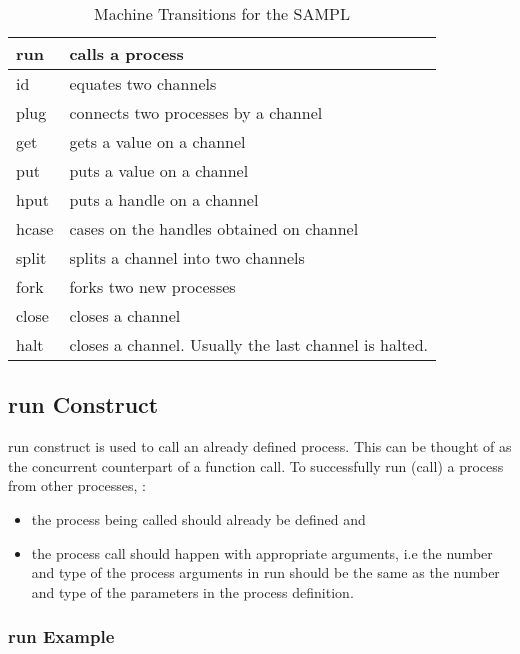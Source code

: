 \documentclass[11pt]{article}
\newcommand{\<}{\langle}
\renewcommand{\>}{\rangle}
\begin{document}
\begin{table}[!h]
\begin{center}
    \begin{tabular}{|l||l|}
    \hline 
        {\sf run} & calls a process \\ \hline 
        {\sf id}  & equates two channels \\ \hline 
        {\sf plug} & connects two processes by a channel \\ \hline  
        {\sf get} & gets a value on a channel \\ \hline 
        {\sf put} & puts a value on a channel \\ \hline 
        {\sf hput} & puts a handle on a channel \\ \hline 
        {\sf hcase} & cases on the handles obtained on channel \\ \hline 
        {\sf split} & splits a channel into two channels \\ \hline 
        {\sf fork} & forks two new processes \\ \hline 
        {\sf close} & closes a channel \\ \hline 
        {\sf halt} & closes a channel. Usually the last channel is halted. \\ \hline
   \end{tabular}
\caption{Machine Transitions for the SAMPL}
\label{Conc:constr_desc}
\end{center}
\end{table}


\subsection{run Construct}\label{conc:run_desc}
{\sf run} construct is used to call an already defined process. This can be thought of as the concurrent counterpart of a function call. To successfully {\sf run} (call) a process from other processes, :
\begin{itemize}
  \item the process being called should already be defined and
  \item the process call should happen with appropriate arguments, i.e the number and type of the process arguments in {\sf run} should be the same as the number and type of the parameters in the process definition.
\end {itemize}
\subsubsection {run Example} 
\end{document}
